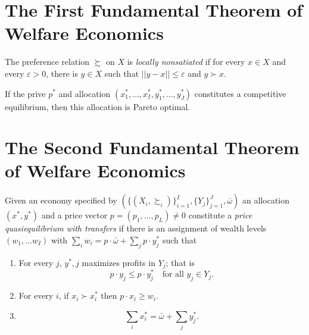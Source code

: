 \section{The First Fundamental Theorem of Welfare Economics}

\begin{defn}
    The preference relation $\succsim$ on $X$ is \emph{locally nonsatiated} if for every $x \in X$ and every $\varepsilon > 0$, there is $y \in X$ such that $||y - x || \leq \varepsilon$ and $y \succ x$.
\end{defn}

\begin{prop}
    If the prive $p^*$ and allocation $(x^*_1, \dots, x^*_I, y^*_1, \dots, y^*_J)$ constitutes a competitive equilibrium, then this allocation is Pareto optimal.
\end{prop}


\section{The Second Fundamental Theorem of Welfare Economics}

\begin{defn}
    Given an economy specified by $\left(\{(X_i, \succsim_i)\}_{i = 1}^I, \{Y_j\}_{j = 1}^J, \bar{\omega}\right)$ an allocation $(x^*, y^*)$ and a price vector $p = (p_1, \dots, p_L) \neq 0$ constitute a \emph{price quasiequilibrium with transfers} if there is an assignment of wealth levels $(w_1, \dots w_I)$ with $\sum_i w_i = p \cdot \bar{\omega} + \sum_j p \cdot y^*_j$ such that
    \begin{enumerate}
        \item 
        For every $j$, $y^*, j$ maximizes profits in $Y_j$; that is
        \begin{equation*}
            p \cdot y_j \leq p \cdot y^*_j \quad \text{for all } y_j \in Y_j.
        \end{equation*}

        \item 
        For every $i$, if $x_i \succ x^*_i$ then $p \cdot x_i \geq w_i$.

        \item 
        \begin{equation*}
            \sum_i x^*_i = \bar{\omega} + \sum_j y^*_j.
        \end{equation*}
    \end{enumerate}
\end{defn}

